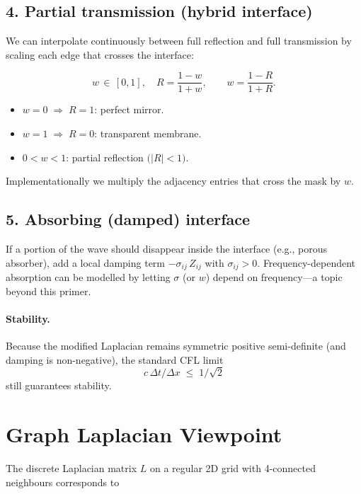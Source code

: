 \documentclass{article}
\begin{document}
\subsection*{4. Partial transmission (hybrid interface)}

We can interpolate continuously between full reflection and full
transmission by scaling each edge that crosses the interface:

\[
w\,\in\,[0,1],\quad
R=\frac{1-w}{1+w},\qquad
w=\frac{1-R}{1+R}.
\]

\begin{itemize}
  \item \(w=0\;\Rightarrow\;R=1\): perfect mirror.
  \item \(w=1\;\Rightarrow\;R=0\): transparent membrane.
  \item \(0<w<1\): partial reflection \(\bigl(|R|<1\bigr)\).
\end{itemize}

Implementationally we multiply the adjacency entries that cross the
mask by \(w\).

\subsection*{5. Absorbing (damped) interface}

If a portion of the wave should disappear inside the interface (e.g.,
porous absorber), add a local damping term
\(-\sigma_{ij}\,Z_{ij}\) with \(\sigma_{ij}>0\).
Frequency-dependent absorption can be modelled by letting
\(\sigma\) (or \(w\)) depend on frequency—a topic beyond this primer.

\paragraph{Stability.}  Because the modified Laplacian remains symmetric
positive semi-definite (and damping is non-negative), the standard
CFL limit
\[
c\,\Delta t/\Delta x \;\le\; 1/\sqrt{2}
\]
still guarantees stability.



\section*{Graph Laplacian Viewpoint}

The discrete Laplacian matrix \(L\) on a regular 2D grid with 4-connected neighbours corresponds to
\end{document}

